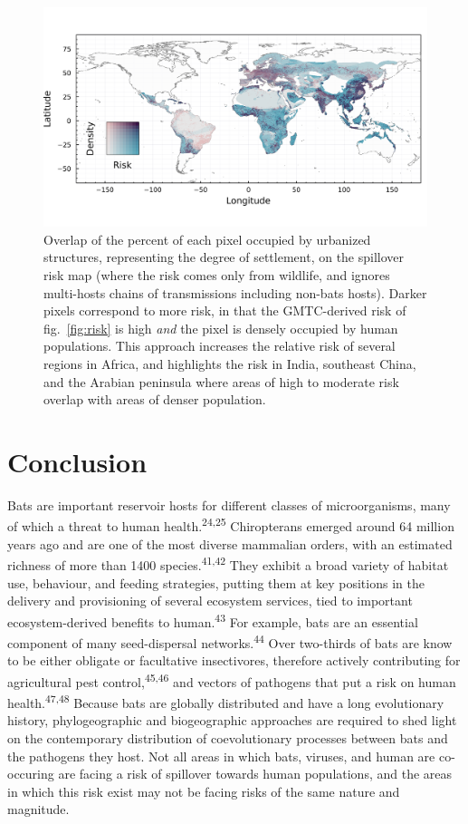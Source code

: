 \documentclass[10pt,oneside]{article}
\makeatletter
\def\maxwidth{\ifdim\Gin@nat@width>\linewidth\linewidth
\else\Gin@nat@width\fi}
\let\Oldincludegraphics\includegraphics
\renewcommand{\includegraphics}[1]{\Oldincludegraphics[width=\maxwidth]{#1}}
\makeatother
\begin{document}
\begin{figure}
\hypertarget{fig:compound}{%
\centering
\includegraphics{figures/risk_compounded.png}
\caption{Overlap of the percent of each pixel occupied by urbanized
structures, representing the degree of settlement, on the spillover risk
map (where the risk comes only from wildlife, and ignores multi-hosts
chains of transmissions including non-bats hosts). Darker pixels
correspond to more risk, in that the GMTC-derived risk of
fig.~\ref{fig:risk} is high \emph{and} the pixel is densely occupied by
human populations. This approach increases the relative risk of several
regions in Africa, and highlights the risk in India, southeast China,
and the Arabian peninsula where areas of high to moderate risk overlap
with areas of denser population.}\label{fig:compound}
}
\end{figure}

\hypertarget{conclusion}{%
\section{Conclusion}\label{conclusion}}

Bats are important reservoir hosts for different classes of
microorganisms, many of which a threat to human
health.\textsuperscript{24,25} Chiropterans emerged around 64 million
years ago and are one of the most diverse mammalian orders, with an
estimated richness of more than 1400 species.\textsuperscript{41,42}
They exhibit a broad variety of habitat use, behaviour, and feeding
strategies, putting them at key positions in the delivery and
provisioning of several ecosystem services, tied to important
ecosystem-derived benefits to human.\textsuperscript{43} For example,
bats are an essential component of many seed-dispersal
networks.\textsuperscript{44} Over two-thirds of bats are know to be
either obligate or facultative insectivores, therefore actively
contributing for agricultural pest control,\textsuperscript{45,46} and
vectors of pathogens that put a risk on human
health.\textsuperscript{47,48} Because bats are globally distributed and
have a long evolutionary history, phylogeographic and biogeographic
approaches are required to shed light on the contemporary distribution
of coevolutionary processes between bats and the pathogens they host.
Not all areas in which bats, viruses, and human are co-occuring are
facing a risk of spillover towards human populations, and the areas in
which this risk exist may not be facing risks of the same nature and
magnitude.
\end{document}
